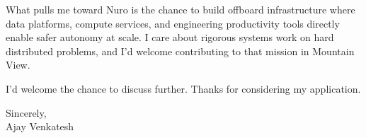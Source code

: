 \documentclass[letterpaper,11pt]{article}
\begin{document}
What pulls me toward Nuro is the chance to build offboard infrastructure where data platforms, compute services, and engineering productivity tools directly enable safer autonomy at scale. I care about rigorous systems work on hard distributed problems, and I'd welcome contributing to that mission in Mountain View.

I'd welcome the chance to discuss further. Thanks for considering my application.

\vspace{12pt}
Sincerely, \\
Ajay Venkatesh
\end{document}
